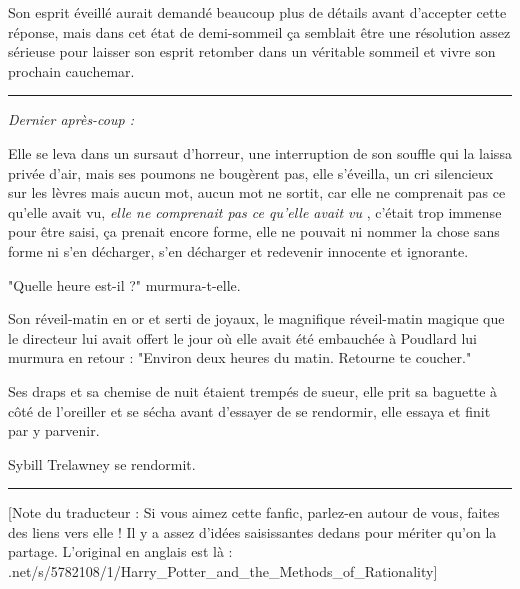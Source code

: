 Son esprit éveillé aurait demandé beaucoup plus de détails avant d'accepter cette réponse, mais dans cet état de demi-sommeil ça semblait être une résolution assez sérieuse pour laisser son esprit retomber dans un véritable sommeil et vivre son prochain cauchemar.
\par\noindent\rule{\textwidth}{0.4pt}
\emph{Dernier après-coup :} 

Elle se leva dans un sursaut d'horreur, une interruption de son souffle qui la laissa privée d'air, mais ses poumons ne bougèrent pas, elle s'éveilla, un cri silencieux sur les lèvres mais aucun mot, aucun mot ne sortit, car elle ne comprenait pas ce qu'elle avait vu, \emph{elle ne comprenait pas ce qu'elle avait vu} , c'était trop immense pour être saisi, ça prenait encore forme, elle ne pouvait ni nommer la chose sans forme ni s'en décharger, s'en décharger et redevenir innocente et ignorante.

"Quelle heure est-il ?" murmura-t-elle.

Son réveil-matin en or et serti de joyaux, le magnifique réveil-matin magique que le directeur lui avait offert le jour où elle avait été embauchée à Poudlard lui murmura en retour : "Environ deux heures du matin. Retourne te coucher."

Ses draps et sa chemise de nuit étaient trempés de sueur, elle prit sa baguette à côté de l'oreiller et se sécha avant d'essayer de se rendormir, elle essaya et finit par y parvenir.

Sybill Trelawney se rendormit.
\par\noindent\rule{\textwidth}{0.4pt}
[Note du traducteur : Si vous aimez cette fanfic, parlez-en autour de vous, faites des liens vers elle ! Il y a assez d'idées saisissantes dedans pour mériter qu'on la partage. L'original en anglais est là : .net/s/5782108/1/Harry\_Potter\_and\_the\_Methods\_of\_Rationality]

